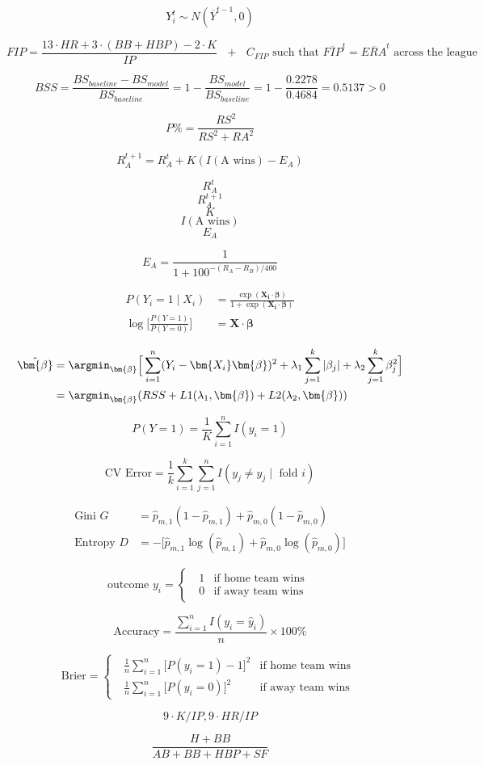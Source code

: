 $$Y_i^t \sim N(\overline{Y}^{t-1}, 0)$$

$$FIP = \frac{13\cdot HR + 3\cdot (BB + HBP) - 2 \cdot K}{IP} \text{ }+ \text{ }C_{FIP} \text{   such that   } \overline{FIP}^t = \overline{ERA}^t \text{   across the league }$$

$$BSS = \frac{BS_{baseline} - BS_{model}}{BS_{baseline}} = 1 - \frac{BS_{model}}{BS_{baseline}} = 1 - \frac{0.2278}{0.4684} = 0.5137 > 0$$

$$P\% = \frac{RS^2}{RS^2+RA^2}$$

$$R_A^{t+1} = R_A^t + K(I(\text{A wins})-E_A)$$

$$R_A^t$$
$$R_A^{t+1}$$
$$K$$
$$I(\text{A wins})$$
$$E_A$$

$$E_A = \frac{1}{1+100^{-(R_A-R_B)/400}}$$

\begin{align*}
  P(Y_i = 1 \mid X_i) &= \frac{\exp(\bm{X_i}\cdot \bm{\beta})}{1 + \exp(\bm{X_i}\cdot \bm{\beta})}  \tag{logistic curve}\\
  \log \Big[\frac{P(Y=1)}{P(Y=0)}\Big] &= \bm{X}\cdot \bm{\beta} \tag{log-odds}
\end{align*}

\begin{align*}
\hat{\bm{\beta}} &= \argmin_{\bm{\beta}} \Big[ \sum_{i=1}^n (Y_i-\bm{X_i} \bm{\beta})^2
+ \lambda_1 \sum_{j=1}^k |\beta_j|
+ \lambda_2 \sum_{j=1}^k \beta_j^2
\Big] \\
&= \argmin_{\bm{\beta}} (RSS + L1(\lambda_1, \bm{\beta})+ L2(\lambda_2, \bm{\beta}))
\end{align*}

$$P(Y=1)= \frac{1}{K}\sum_{i=1}^n I(y_i=1)$$


$$\text{CV Error} = \frac{1}{k}\sum_{i=1}^k \sum_{j=1}^n I(y_j \neq \hat{y}_j \mid \text{ fold } i)$$

\begin{align*}
  \text{Gini } G &= \hat{p}_{m, 1} (1-\hat{p}_{m, 1}) + \hat{p}_{m, 0}(1-\hat{p}_{m, 0}) \tag{only two classes}\\
  \text{Entropy } D &= -\big[\hat{p}_{m, 1}\log(\hat{p}_{m, 1}) + \hat{p}_{m, 0}\log(\hat{p}_{m, 0})\big]
\end{align*}


$$
\text{outcome }y_i = \begin{cases}
  \text{ }1 & \text{if home team wins } \\
  \text{ }0 & \text{if away team wins } 
\end{cases}
$$

$$\text{Accuracy} = \frac{\sum_{i=1}^n I(y_i = \hat{y}_i)}{n} \times 100\%$$

$$\text{Brier} = \begin{cases}
  \text{ }\frac{1}{n} \sum_{i=1}^n \big[P(y_i = 1) - 1\big]^2 & \text{if home team wins } \\
  \text{ }\frac{1}{n} \sum_{i=1}^n \big[P(y_i = 0)\big]^2 & \text{if away team wins } 
\end{cases}
$$

$$9\cdot K/IP,\text{} 9\cdot HR/IP$$

$$\frac{H+BB}{AB+BB+HBP+SF}$$